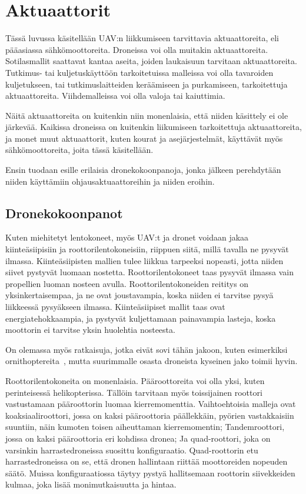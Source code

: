 \chapter{Aktuaattorit}
\label{ch:aktuaattorit}

Tässä luvussa käsitellään UAV:n liikkumiseen tarvittavia aktuaattoreita, eli
pääasiassa sähkömoottoreita. Droneissa voi olla muitakin aktuaattoreita.
Sotilasmallit saattavat kantaa aseita, joiden laukaisuun tarvitaan
aktuaattoreita. Tutkimus- tai kuljetuskäyttöön tarkoitetuissa malleissa voi
olla tavaroiden kuljetukseen, tai tutkimuslaitteiden keräämiseen ja
purkamiseen, tarkoitettuja aktuaattoreita. Viihdemalleissa voi olla valoja tai
kaiuttimia.

Näitä aktuaattoreita on kuitenkin niin monenlaisia, että niiden käsittely ei
ole järkevää. Kaikissa droneissa on kuitenkin liikumiseen tarkoitettuja
aktuaattoreita, ja monet muut aktuaattorit, kuten kourat ja asejärjestelmät,
käyttävät myös sähkömoottoreita, joita tässä käsitellään.

Ensin tuodaan esille erilaisia dronekokoonpanoja, jonka jälkeen perehdytään
niiden käyttämiin ohjausaktuaattoreihin ja niiden eroihin.

\section{Dronekokoonpanot}

Kuten miehitetyt lentokoneet, myös UAV:t ja dronet voidaan jakaa
kiinteäsiipisiin ja roottorilentokoneisiin, riippuen siitä, millä tavalla ne
pysyvät ilmassa. Kiinteäsiipisten mallien tulee liikkua tarpeeksi nopeasti,
jotta niiden siivet pystyvät luomaan nostetta. Roottorilentokoneet taas pysyvät
ilmassa vain propellien luoman nosteen avulla. Roottorilentokoneiden reititys
on yksinkertaisempaa, ja ne ovat joustavampia, koska niiden ei tarvitse pysyä
liikkeessä pysyäkseen ilmassa. Kiinteäsiipiset mallit taas ovat
energiatehokkaampia, ja pystyvät kuljettamaan painavampia lasteja, koska
moottorin ei tarvitse yksin huolehtia nosteesta.~\cite{Austin2010}

On olemassa myös ratkaisuja, jotka eivät sovi tähän jakoon, kuten esimerkiksi
ornithoptereita~\cite{Austin2010}, mutta suurimmalle osasta droneista kyseinen
jako toimii hyvin.

Roottorilentokoneita on monenlaisia. Pääroottoreita voi olla yksi, kuten
perinteisessä helikopterissa. Tällöin tarvitaan myös toissijainen roottori
vastustamaan pääroottorin luomaa kierremomenttia. Vaihtoehtoisia malleja ovat
koaksiaaliroottori, jossa on kaksi pääroottoria päällekkäin, pyörien
vastakkaisiin suuntiin, näin kumoten toisen aiheuttaman kierremomentin;
Tandemroottori, jossa on kaksi pääroottoria eri kohdissa dronea; Ja
quad-roottori, joka on varsinkin harrastedroneissa suosittu konfiguraatio.
Quad-roottorin etu harrastedroneissa on se, että dronen hallintaan riittää
moottoreiden nopeuden säätö. Muissa konfiguraatiossa täytyy pystyä hallitsemaan
roottorin siivekkeiden kulmaa, joka lisää monimutkaisuutta ja
hintaa.~\cite{Austin2010}

